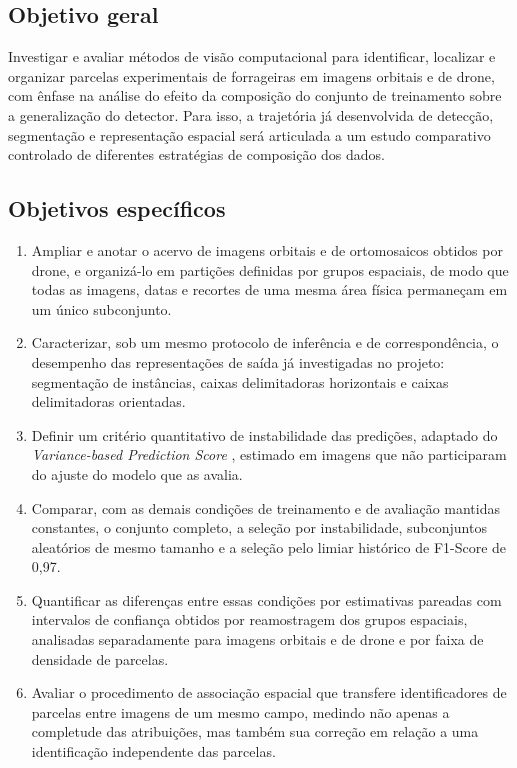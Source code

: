 \subsection*{Objetivo geral}

Investigar e avaliar m\'etodos de vis\~ao computacional para identificar, localizar e organizar parcelas experimentais de forrageiras em imagens orbitais e de drone, com \^enfase na an\'alise do efeito da composi\c{c}\~ao do conjunto de treinamento sobre a generaliza\c{c}\~ao do detector. Para isso, a trajet\'oria j\'a desenvolvida de detec\c{c}\~ao, segmenta\c{c}\~ao e representa\c{c}\~ao espacial ser\'a articulada a um estudo comparativo controlado de diferentes estrat\'egias de composi\c{c}\~ao dos dados.

\subsection*{Objetivos espec\'ificos}

\begin{enumerate}
  \item Ampliar e anotar o acervo de imagens orbitais e de ortomosaicos obtidos por drone, e organiz\'a-lo em parti\c{c}\~oes definidas por grupos espaciais, de modo que todas as imagens, datas e recortes de uma mesma \'area f\'isica permane\c{c}am em um \'unico subconjunto.
  \item Caracterizar, sob um mesmo protocolo de infer\^encia e de correspond\^encia, o desempenho das representa\c{c}\~oes de sa\'ida j\'a investigadas no projeto: segmenta\c{c}\~ao de inst\^ancias, caixas delimitadoras horizontais e caixas delimitadoras orientadas.
  \item Definir um crit\'erio quantitativo de instabilidade das predi\c{c}\~oes, adaptado do \textit{Variance-based Prediction Score} \citep{yagi2025}, estimado em imagens que n\~ao participaram do ajuste do modelo que as avalia.
  \item Comparar, com as demais condi\c{c}\~oes de treinamento e de avalia\c{c}\~ao mantidas constantes, o conjunto completo, a sele\c{c}\~ao por instabilidade, subconjuntos aleat\'orios de mesmo tamanho e a sele\c{c}\~ao pelo limiar hist\'orico de F1-Score de 0,97.
  \item Quantificar as diferen\c{c}as entre essas condi\c{c}\~oes por estimativas pareadas com intervalos de confian\c{c}a obtidos por reamostragem dos grupos espaciais, analisadas separadamente para imagens orbitais e de drone e por faixa de densidade de parcelas.
  \item Avaliar o procedimento de associa\c{c}\~ao espacial que transfere identificadores de parcelas entre imagens de um mesmo campo, medindo n\~ao apenas a completude das atribui\c{c}\~oes, mas tamb\'em sua corre\c{c}\~ao em rela\c{c}\~ao a uma identifica\c{c}\~ao independente das parcelas.
\end{enumerate}

